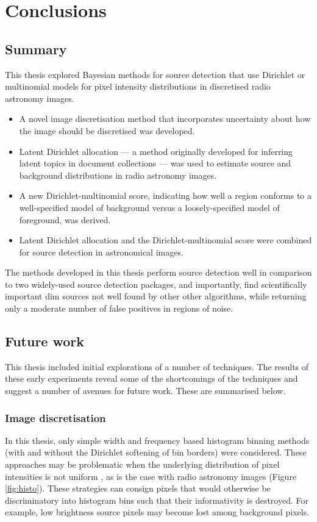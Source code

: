 \chapter{Conclusions}\label{C:con}

\section{Summary}
This thesis explored Bayesian methods for source detection that use Dirichlet or multinomial models for pixel intensity distributions in discretised radio astronomy images. 
\begin{itemize}
\item A novel image discretisation method that incorporates uncertainty about how the image should be discretised was developed.
\item Latent Dirichlet allocation --- a method originally developed for inferring latent topics in document collections --- was used to estimate source and background distributions in radio astronomy images. 
\item A new Dirichlet-multinomial score, indicating how well a region conforms to a well-specified model of background versus a loosely-specified model of foreground, was derived.
\item Latent Dirichlet allocation and the Dirichlet-multinomial score were combined for source detection in astronomical images. 
\end{itemize}

The methods developed in this thesis perform source detection well in comparison to two widely-used source detection packages, and importantly, find scientifically important dim sources not well found by other other algorithms, while returning only a moderate number of false positives in regions of noise.

\section{Future work}
This thesis included initial explorations of a number of techniques. The results of these early experiments reveal some of the shortcomings of the techniques and suggest a number of avenues for future work. These are summarised below.

\subsection{Image discretisation}

In this thesis, only simple width and frequency based histogram binning methods (with and without the Dirichlet softening of bin borders) were considered. These approaches may be problematic when the underlying distribution of pixel intensities is not uniform \cite{liu2002discretization}, as is the case with radio astronomy images (Figure \ref{fig:histo}). These strategies can consign pixels that would otherwise be discriminatory into histogram bins such that their informativity is destroyed. For example, low brightness source pixels may become lost among background pixels. 

